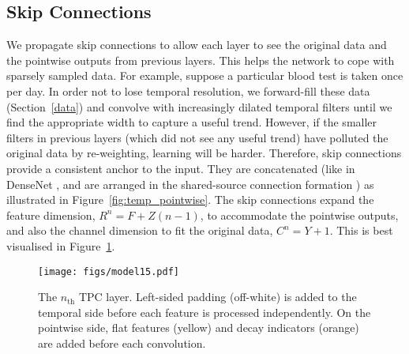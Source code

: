 \documentclass[sigconf]{acmart}
\begin{document}
\subsection{Skip Connections}
\label{skip}
We propagate skip connections \citep{DBLP:journals/corr/HeZRS15} to allow each layer to see the original data and the pointwise outputs from previous layers. This helps the network to cope with sparsely sampled data. For example, suppose a particular blood test is taken once per day. In order not to lose temporal resolution, we forward-fill these data (Section~\ref{data}) and convolve with increasingly dilated temporal filters until we find the appropriate width to capture a useful trend. However, if the smaller filters in previous layers (which did not see any useful trend) have polluted the original data by re-weighting, learning will be harder. Therefore, skip connections provide a consistent anchor to the input. They are concatenated (like in DenseNet \citep{densenet}, and are arranged in the shared-source connection formation \citep{wang20188}) as illustrated in Figure~\ref{fig:temp_pointwise}. The skip connections expand the feature dimension, $R^{n}=F+Z(n-1)$, to accommodate the pointwise outputs, and also the channel dimension to fit the original data, $C^{n}=Y+1$. This is best visualised in Figure~\ref{fig:TPC}.

\begin{figure}
\texttt{[image: figs/model15.pdf]}
\caption{The $n_\text{th}$ TPC layer. Left-sided padding (off-white) is added to the temporal side before each feature is processed independently. On the pointwise side, flat features (yellow) and decay indicators (orange) are added before each convolution.} 
\label{fig:TPC}
\end{figure}
\end{document}
